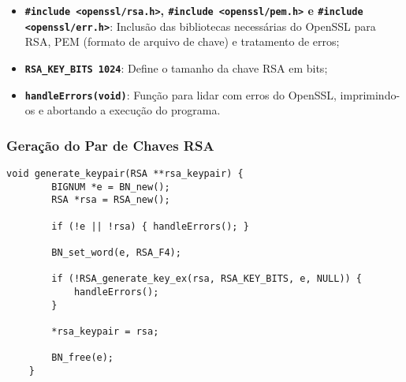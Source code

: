 \documentclass[a4paper,12pt]{article}
\begin{document}
\begin{itemize}
    \item \textbf{\lstinline[style=CStyle]{#include <openssl/rsa.h>}, \lstinline[style=CStyle]{#include <openssl/pem.h>} e \lstinline[style=CStyle]{#include <openssl/err.h>}}: Inclusão das bibliotecas necessárias do OpenSSL para RSA, PEM (formato de arquivo de chave) e tratamento de erros;
    \item \textbf{\lstinline[style=CStyle]{RSA_KEY_BITS 1024}}: Define o tamanho da chave RSA em bits;
    \item \textbf{\lstinline[style=CStyle]{handleErrors(void)}}: Função para lidar com erros do OpenSSL, imprimindo-os e abortando a execução do programa.
\end{itemize}

\subsubsection*{Geração do Par de Chaves RSA}
\begin{lstlisting}[style=CStyle]
    void generate_keypair(RSA **rsa_keypair) {
        BIGNUM *e = BN_new();
        RSA *rsa = RSA_new();

        if (!e || !rsa) { handleErrors(); }

        BN_set_word(e, RSA_F4);

        if (!RSA_generate_key_ex(rsa, RSA_KEY_BITS, e, NULL)) {
            handleErrors();
        }

        *rsa_keypair = rsa;

        BN_free(e);
    }
\end{lstlisting}
\end{document}
